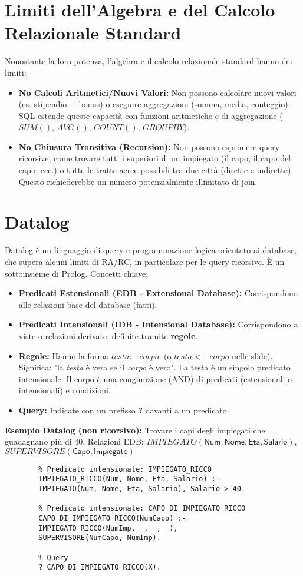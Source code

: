 \documentclass{article}
\newcommand{\Rel}[1]{\textit{#1}} %
\newcommand{\Attr}[1]{\textsf{#1}} %
\begin{document}
	\section{Limiti dell'Algebra e del Calcolo Relazionale Standard}
	Nonostante la loro potenza, l'algebra e il calcolo relazionale standard hanno dei limiti:
	\begin{itemize}
		\item \textbf{No Calcoli Aritmetici/Nuovi Valori:} Non possono calcolare nuovi valori (es. stipendio + bonus) o eseguire aggregazioni (somma, media, conteggio). SQL estende queste capacità con funzioni aritmetiche e di aggregazione ($SUM()$, $AVG()$, $COUNT()$, $GROUP BY$).
		\item \textbf{No Chiusura Transitiva (Recursion):} Non possono esprimere query ricorsive, come trovare tutti i superiori di un impiegato (il capo, il capo del capo, ecc.) o tutte le tratte aeree possibili tra due città (dirette e indirette). Questo richiederebbe un numero potenzialmente illimitato di join.
	\end{itemize}
	
	\section{Datalog}
	Datalog è un linguaggio di query e programmazione logica orientato ai database, che supera alcuni limiti di RA/RC, in particolare per le query ricorsive. È un sottoinsieme di Prolog.
	Concetti chiave:
	\begin{itemize}
		\item \textbf{Predicati Estensionali (EDB - Extensional Database):} Corrispondono alle relazioni base del database (fatti).
		\item \textbf{Predicati Intensionali (IDB - Intensional Database):} Corrispondono a viste o relazioni derivate, definite tramite \textbf{regole}.
		\item \textbf{Regole:} Hanno la forma $testa :- corpo.$ (o $testa <- corpo$ nelle slide).
		Significa: "la \textit{testa} è vera se il \textit{corpo} è vero".
		La testa è un singolo predicato intensionale. Il corpo è una congiunzione (AND) di predicati (estensionali o intensionali) e condizioni.
		\item \textbf{Query:} Indicate con un prefisso \textbf{?} davanti a un predicato.
	\end{itemize}
	
	\textbf{Esempio Datalog (non ricorsivo):} Trovare i capi degli impiegati che guadagnano più di 40.
	Relazioni EDB: $\Rel{IMPIEGATO}(\Attr{Num}, \Attr{Nome}, \Attr{Eta}, \Attr{Salario})$, $\Rel{SUPERVISORE}(\Attr{Capo}, \Attr{Impiegato})$
	\begin{verbatim}
		% Predicato intensionale: IMPIEGATO_RICCO
		IMPIEGATO_RICCO(Num, Nome, Eta, Salario) :-
		IMPIEGATO(Num, Nome, Eta, Salario), Salario > 40.
		
		% Predicato intensionale: CAPO_DI_IMPIEGATO_RICCO
		CAPO_DI_IMPIEGATO_RICCO(NumCapo) :-
		IMPIEGATO_RICCO(NumImp, _, _, _),
		SUPERVISORE(NumCapo, NumImp).
		
		% Query
		? CAPO_DI_IMPIEGATO_RICCO(X).
	\end{verbatim}
	
\end{document}
